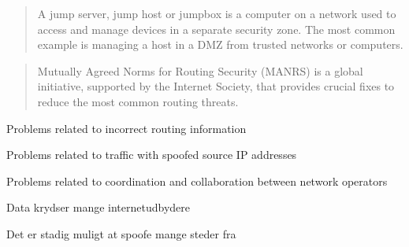 \documentclass[Screen16to9,17pt]{foils}
\begin{document}


\begin{quote}
A jump server, jump host or jumpbox is a computer on a network used to access and manage devices in a separate security zone. The most common example is managing a host in a DMZ from trusted networks or computers.
\end{quote}






\begin{quote}
  Mutually Agreed Norms for Routing Security (MANRS) is a global initiative, supported by the Internet Society, that provides crucial fixes to reduce the most common routing threats. ﻿
\end{quote}

\begin{list1}
\item Problems related to incorrect routing information
\item Problems related to traffic with spoofed source IP addresses
\item Problems related to coordination and collaboration between network operators
\item {\small{}}
\item {\small{}}
\end{list1}




\begin{list2}
\item Data krydser mange internetudbydere
\item Det er stadig muligt at spoofe mange steder fra
\end{list2}

\end{document}
